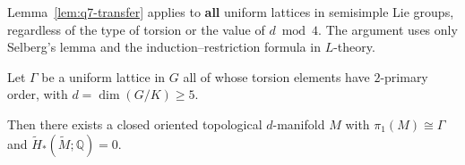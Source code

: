 \begin{remark}
Lemma~\ref{lem:q7-transfer} applies to \textbf{all} uniform lattices in
semisimple Lie groups, regardless of the type of torsion or the value
of $d\bmod 4$.  The argument uses only Selberg's lemma and the
induction--restriction formula in $L$-theory.
\end{remark}

\begin{theorem}\label{thm:q7-existence}
Let $\Gamma$ be a uniform lattice in $G$ all of whose torsion elements have
$2$-primary order, with $d=\dim(G/K)\ge 5$.

Then there exists a closed oriented topological $d$-manifold $M$ with
$\pi_1(M)\cong\Gamma$ and $\widetilde H_*(\widetilde M;\mathbb Q)=0$.
\end{theorem}

